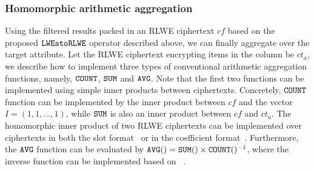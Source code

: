 \subsubsection{Homomorphic arithmetic aggregation}
Using the filtered results packed in an RLWE ciphertext $cf$ based on
the proposed $\texttt{LWEstoRLWE}$ operator described above, we can finally
aggregate over the target attribute.  Let the RLWE ciphertext
encrypting items in the column be $ct_a$, we describe how
to implement three types of conventional arithmetic aggregation functions, 
namely, $\texttt{COUNT}$, $\texttt{SUM}$ and $\texttt{AVG}$.
Note that the first two functions can be implemented using simple inner
products between ciphertexts. Concretely,
$\texttt{COUNT}$ function can be implemented by the inner product between $cf$ and
the vector $I = (1, 1, ...,1)$, while $\texttt{SUM}$
is also an inner product between $cf$ and $ct_a$.
The homomorphic inner product of two RLWE ciphertexts can
be implemented over ciphertexts in both the slot format~\cite{gazelle, pegasus} 
or in the coefficient format~\cite{cheetah, heda}.
Furthermore, the $\texttt{AVG}$ function can be evaluated by 
$\texttt{AVG}() = \texttt{SUM}()\times 
\texttt{COUNT}()^{-1}$, where the inverse function 
can be implemented based on ~\cite{ckkscomparison}.



